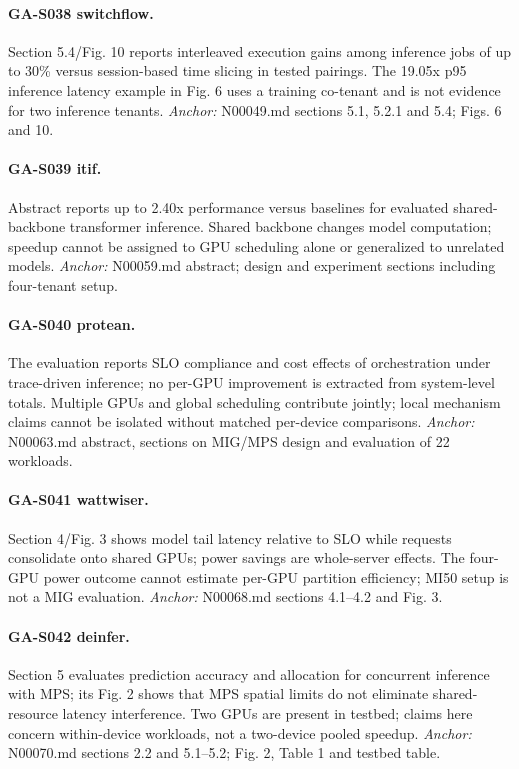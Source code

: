 \paragraph{GA-S038 switchflow.} Section 5.4/Fig. 10 reports interleaved execution gains among inference jobs of up to 30\% versus session-based time slicing in tested pairings. The 19.05x p95 inference latency example in Fig. 6 uses a training co-tenant and is not evidence for two inference tenants. \textit{Anchor:} N00049.md sections 5.1, 5.2.1 and 5.4; Figs. 6 and 10.

\paragraph{GA-S039 itif.} Abstract reports up to 2.40x performance versus baselines for evaluated shared-backbone transformer inference. Shared backbone changes model computation; speedup cannot be assigned to GPU scheduling alone or generalized to unrelated models. \textit{Anchor:} N00059.md abstract; design and experiment sections including four-tenant setup.

\paragraph{GA-S040 protean.} The evaluation reports SLO compliance and cost effects of orchestration under trace-driven inference; no per-GPU improvement is extracted from system-level totals. Multiple GPUs and global scheduling contribute jointly; local mechanism claims cannot be isolated without matched per-device comparisons. \textit{Anchor:} N00063.md abstract, sections on MIG/MPS design and evaluation of 22 workloads.

\paragraph{GA-S041 wattwiser.} Section 4/Fig. 3 shows model tail latency relative to SLO while requests consolidate onto shared GPUs; power savings are whole-server effects. The four-GPU power outcome cannot estimate per-GPU partition efficiency; MI50 setup is not a MIG evaluation. \textit{Anchor:} N00068.md sections 4.1–4.2 and Fig. 3.

\paragraph{GA-S042 deinfer.} Section 5 evaluates prediction accuracy and allocation for concurrent inference with MPS; its Fig. 2 shows that MPS spatial limits do not eliminate shared-resource latency interference. Two GPUs are present in testbed; claims here concern within-device workloads, not a two-device pooled speedup. \textit{Anchor:} N00070.md sections 2.2 and 5.1–5.2; Fig. 2, Table 1 and testbed table.

